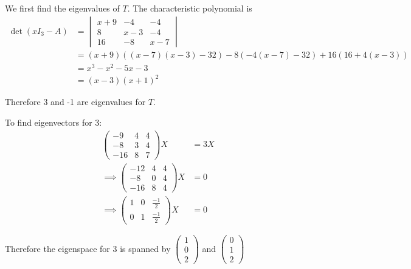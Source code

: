 \documentclass[a4paper, 10pt]{article}
\begin{document}
\begin{solution}
    We first find the eigenvalues of \(T\). The characteristic polynomial is \begin{align*}
        \det (x I_3 - A) & = \begin{vmatrix}
                                 x + 9 & -4  & -4  \\
                                 8     & x-3 & -4  \\
                                 16    & - 8 & x-7
                             \end{vmatrix}                                           \\
                         & = (x+9)((x-7)(x-3) -32) - 8 (-4(x-7) - 32) + 16 (16 + 4(x-3)) \\
                         & = x^3 - x^2 - 5x - 3                                          \\
                         & = (x-3)(x+1)^2
    \end{align*}

    Therefore 3 and -1 are eigenvalues for \(T\).

    To find eigenvectors for 3:
    \begin{align*}
        \begin{pmatrix}
            -9  & 4 & 4 \\
            -8  & 3 & 4 \\
            -16 & 8 & 7
        \end{pmatrix} X          & = 3 X \\
        \implies \begin{pmatrix}
                     -12 & 4 & 4 \\
                     -8  & 0 & 4 \\
                     -16 & 8 & 4
                 \end{pmatrix} X & = 0   \\
        \implies \begin{pmatrix}
                     1 & 0 & \frac{-1}{2} \\
                     0 & 1 & \frac{-1}{2}
                 \end{pmatrix} X & = 0
    \end{align*}

    Therefore the eigenspace for 3 is spanned by \(\begin{pmatrix}
        1 \\ 0 \\ 2
    \end{pmatrix}\) and \(\begin{pmatrix}
        0 \\ 1 \\ 2
    \end{pmatrix}\)


\end{solution}
\end{document}

